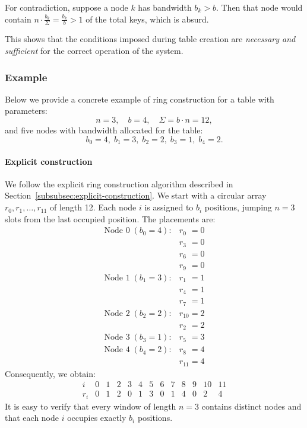For contradiction, suppose a node $k$ has bandwidth $b_k > b$.
Then that node would contain $\displaystyle n \cdot \frac{b_k}{\Sigma} = \frac{b_k}{b} > 1$ of the total keys, which is absurd.

This shows that the conditions imposed during table creation are \emph{necessary and sufficient} for the correct operation of the system.

\subsubsection{Example}
\label{subsubsec:ring-example}

Below we provide a concrete example of ring construction for a table with parameters:
\[
    n = 3,\quad
    b = 4,\quad
    \Sigma = b \cdot n = 12,
\]
and five nodes with bandwidth allocated for the table:
\[
    b_0 = 4,\; b_1 = 3,\; b_2 = 2,\; b_3 = 1,\; b_4 = 2.
\]

\paragraph{Explicit construction}
We follow the explicit ring construction algorithm described in Section~\ref{subsubsec:explicit-construction}.
We start with a circular array \(r_0, r_1, \dots, r_{11}\) of length 12.
Each node \(i\) is assigned to \(b_i\) positions, jumping \(n=3\) slots from the last occupied position.
The placements are:
\[
    \begin{array}{rl}
        \text{Node }0\;(b_0=4): & r_{0\phantom{0}} = 0 \\
                                & r_{3\phantom{0}} = 0 \\
                                & r_{6\phantom{0}} = 0 \\
                                & r_{9\phantom{0}} = 0 \\[0.5ex]
        \text{Node }1\;(b_1=3): & r_{1\phantom{0}} = 1 \\
                                & r_{4\phantom{0}} = 1 \\
                                & r_{7\phantom{0}} = 1 \\[0.5ex]
        \text{Node }2\;(b_2=2): & r_{10} = 2 \\
                                & r_{2\phantom{0}} = 2 \\[0.5ex]
        \text{Node }3\;(b_3=1): & r_{5\phantom{0}} = 3 \\[0.5ex]
        \text{Node }4\;(b_4=2): & r_{8\phantom{0}} = 4 \\
                                & r_{11} = 4
    \end{array}
\]
Consequently, we obtain:
\[
    \begin{array}{c|cccccccccccc}
        i   & 0 & 1 & 2 & 3 & 4 & 5 & 6 & 7 & 8 & 9 & 10 & 11 \\ \hline
        r_i & 0 & 1 & 2 & 0 & 1 & 3 & 0 & 1 & 4 & 0 & 2  & 4
    \end{array}
\]
It is easy to verify that every window of length \(n=3\) contains distinct nodes and that each node \(i\) occupies exactly \(b_i\) positions.

